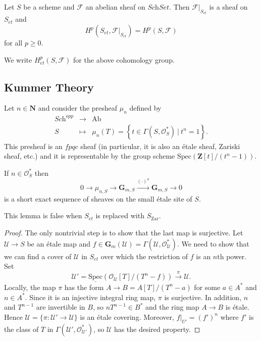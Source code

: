 \begin{proposition}
Let $S$ be a scheme and $\mathcal{F}$ an abelian sheaf on $\textit{Sch}Set$. Then $\mathcal{F}|_{S_{et}}$ is a sheaf on $S_{et}$ and 
$$
H^p(S_{et}, \mathcal{F}|_{S_{et}}) = H^p(S, \mathcal{F}) 
$$
for all $p \geq 0$. 
\end{proposition}

We write $H_{et}^p(S,\mathcal{F})$ for the above cohomology group.

\subsection{Kummer Theory}
Let $n \in \mathbf{N}$ and consider the presheaf $\mu_n$ defined by
$$
\begin{array}{ccl}
\textit{Sch}^{opp} & \longrightarrow  & \text{Ab} \\
S & \longmapsto &  \mu_n(T) =  \left\{t \in \Gamma(S, \mathcal{O}_S^*) \  | \ t^n = 1 \right\}.
\end{array}
$$
This presheaf is an $fpqc$ sheaf (in particular, it is also an \'etale sheaf, Zariski sheaf, etc.) and it is representable by the group scheme $\text{Spec} (\mathbf{Z}[t]/(t^n-1))$. 

\begin{lemma} \label{lem:KummerSequence}
If $n\in \mathcal{O}_S^*$ then 
$$
0\to \mu_{n, S} \to \mathbf{G}_{m, S} \xrightarrow{(\cdot)^n} \mathbf{G}_{m, S}\to 0
$$
is a short exact sequence of sheaves on the small \'etale site of  $S$. 
\end{lemma}

\begin{remark}
This lemma is false when $S_{et}$ is replaced with $S_\mathrm{Zar}$.
\end{remark}

\begin{proof}
The only nontrivial step is to show that the last map is surjective. Let $\mathcal{U} \to S$ be an \'etale map and $f \in \mathbf{G}_m(\mathcal{U}) = \Gamma(\mathcal{U}, \mathcal{O}_\mathcal{U}^*)$. We need to show that we can find a cover of $\mathcal{U}$ in $S_{et}$ over which the restriction of $f$ is an $n$th power. Set
$$
\mathcal{U}' = \underline{\text{Spec}} (\mathcal{O}_\mathcal{U}[T] / (T^n-f)) \xrightarrow{\pi} \mathcal{U}.
$$ 
Locally,  the map $\pi$ has the form $A \to B = A[T] / (T^n-a)$ for some $a \in A^*$ and $n \in A^*$. Since it is an injective integral ring map, $\pi$ is surjective. In addition, $n$ and $T^{n-1}$ are invertible in $B$, so $nT^{n-1} \in B^*$ and the ring map $A \to B$ is \'etale. Hence $\mathcal{U} = \{\pi : \mathcal{U}' \to \mathcal{U}\}$ is an \'etale covering. Moreover, $f|_{U'} = (f')^n$ where $f'$ is the class of $T$ in $\Gamma(\mathcal{U}', \mathcal{O}_{\mathcal{U}'}^*)$, so $\mathcal{U}$ has the desired property.  
\end{proof}

